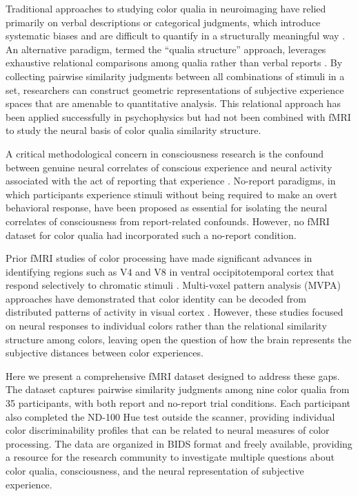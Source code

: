 \documentclass[11pt]{article}
\begin{document}
Traditional approaches to studying color qualia in neuroimaging have relied primarily on verbal descriptions or categorical judgments, which introduce systematic biases and are difficult to quantify in a structurally meaningful way \citep{berlin1969basic}. An alternative paradigm, termed the ``qualia structure'' approach, leverages exhaustive relational comparisons among qualia rather than verbal reports \citep{edelman1998representation}. By collecting pairwise similarity judgments between all combinations of stimuli in a set, researchers can construct geometric representations of subjective experience spaces that are amenable to quantitative analysis. This relational approach has been applied successfully in psychophysics but had not been combined with fMRI to study the neural basis of color qualia similarity structure.

A critical methodological concern in consciousness research is the confound between genuine neural correlates of conscious experience and neural activity associated with the act of reporting that experience \citep{tsuchiya2015no, koch2016neural}. No-report paradigms, in which participants experience stimuli without being required to make an overt behavioral response, have been proposed as essential for isolating the neural correlates of consciousness from report-related confounds. However, no fMRI dataset for color qualia had incorporated such a no-report condition.

Prior fMRI studies of color processing have made significant advances in identifying regions such as V4 and V8 in ventral occipitotemporal cortex that respond selectively to chromatic stimuli \citep{bartels2000architecture, wade2002visual}. Multi-voxel pattern analysis (MVPA) approaches have demonstrated that color identity can be decoded from distributed patterns of activity in visual cortex \citep{brouwer2009decoding}. However, these studies focused on neural responses to individual colors rather than the relational similarity structure among colors, leaving open the question of how the brain represents the subjective distances between color experiences.

Here we present a comprehensive fMRI dataset designed to address these gaps. The dataset captures pairwise similarity judgments among nine color qualia from 35 participants, with both report and no-report trial conditions. Each participant also completed the ND-100 Hue test outside the scanner, providing individual color discriminability profiles that can be related to neural measures of color processing. The data are organized in BIDS format and freely available, providing a resource for the research community to investigate multiple questions about color qualia, consciousness, and the neural representation of subjective experience.
\end{document}
